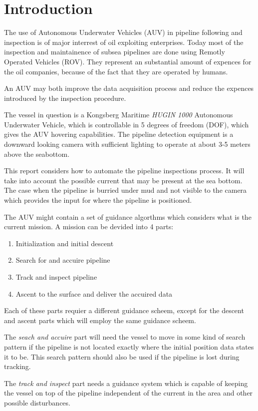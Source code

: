 \chapter{Introduction}

	The use of Autonomous Underwater Vehicles (AUV) in pipeline following and inspection is of major interrest of oil exploiting enterprises. Today most of the inspection and maintainence of subsea pipelines are done using Remotly Operated Vehicles (ROV). They represent an substantial amount of expences for the oil companies, because of the fact that they are operated by humans. 
	
	An AUV may both improve the data acquisition process and reduce the expences introduced by the inspection procedure. 
	
	The vessel in question is a Kongsberg Maritime \textit{HUGIN 1000} Autonomous Underwater Vehicle, which is controllable in 5 degrees of freedom (DOF), which gives the AUV hovering capabilities. The pipeline detection equipment is a downward looking camera with sufficient lighting to operate at about 3-5 meters above the seabottom.
	
	This report considers how to automate the pipeline inspections process. It will take into account the possible current that may be present at the sea bottom. The case when the pipeline is burried under mud and not visible to the camera which provides the input for where the pipeline is positioned. 
	
	The AUV might contain a set of guidance algorthms which considers what is the current mission. A mission can be devided into 4 parts:
	\begin{enumerate}
	 \item Initialization and initial descent
	 \item Search for and accuire pipeline
	 \item Track and inspect pipeline
	 \item Ascent to the surface and deliver the accuired data
	\end{enumerate}
	Each of these parts requier a different guidance scheem, except for the descent and ascent parts which will employ the same guidance scheem. 
	
	The \textit{seach and accuire} part will need the vessel to move in some kind of search pattern if the pipeline is not located exactly where the initial position data states it to be. This search pattern should also be used if the pipeline is lost during tracking. 
	
	The \textit{track and inspect} part needs a guidance system which is capable of keeping the vessel on top of the pipeline independent of the current in the area and other possible disturbances.
	
	
	

